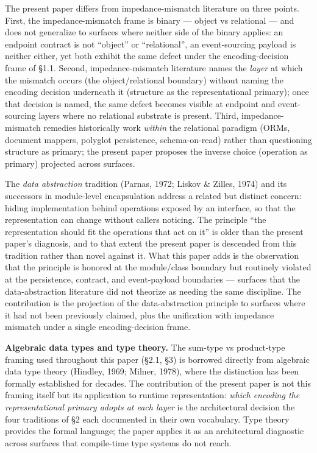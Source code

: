 \documentclass[
]{article}
\begin{document}
The present paper differs from impedance-mismatch literature on three
points. First, the impedance-mismatch frame is binary --- object vs
relational --- and does not generalize to surfaces where neither side of
the binary applies: an endpoint contract is not ``object'' or
``relational'', an event-sourcing payload is neither either, yet both
exhibit the same defect under the encoding-decision frame of §1.1.
Second, impedance-mismatch literature names the \emph{layer} at which
the mismatch occurs (the object/relational boundary) without naming the
encoding decision underneath it (structure as the representational
primary); once that decision is named, the same defect becomes visible
at endpoint and event-sourcing layers where no relational substrate is
present. Third, impedance-mismatch remedies historically work
\emph{within} the relational paradigm (ORMs, document mappers, polyglot
persistence, schema-on-read) rather than questioning structure as
primary; the present paper proposes the inverse choice (operation as
primary) projected across surfaces.

The \emph{data abstraction} tradition (Parnas, 1972; Liskov \& Zilles,
1974) and its successors in module-level encapsulation address a related
but distinct concern: hiding implementation behind operations exposed by
an interface, so that the representation can change without callers
noticing. The principle ``the representation should fit the operations
that act on it'' is older than the present paper's diagnosis, and to
that extent the present paper is descended from this tradition rather
than novel against it. What this paper adds is the observation that the
principle is honored at the module/class boundary but routinely violated
at the persistence, contract, and event-payload boundaries --- surfaces
that the data-abstraction literature did not theorize as needing the
same discipline. The contribution is the projection of the
data-abstraction principle to surfaces where it had not been previously
claimed, plus the unification with impedance mismatch under a single
encoding-decision frame.

\textbf{Algebraic data types and type theory.} The sum-type vs
product-type framing used throughout this paper (§2.1, §3) is borrowed
directly from algebraic data type theory (Hindley, 1969; Milner, 1978),
where the distinction has been formally established for decades. The
contribution of the present paper is not this framing itself but its
application to runtime representation: \emph{which encoding the
representational primary adopts at each layer} is the architectural
decision the four traditions of §2 each documented in their own
vocabulary. Type theory provides the formal language; the paper applies
it as an architectural diagnostic across surfaces that compile-time type
systems do not reach.
\end{document}
